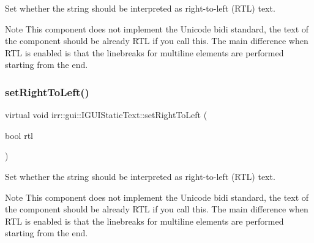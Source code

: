 Set whether the string should be interpreted as right-\/to-\/left (R\+TL) text. 

\begin{DoxyNote}{Note}
This component does not implement the Unicode bidi standard, the text of the component should be already R\+TL if you call this. The main difference when R\+TL is enabled is that the linebreaks for multiline elements are performed starting from the end. 
\end{DoxyNote}
\mbox{\label{classirr_1_1gui_1_1IGUIStaticText_a43cee247cf34faa30851f4e8c10b2367}} 
\subsubsection{\texorpdfstring{set\+Right\+To\+Left()}{setRightToLeft()}\hspace{0.1cm}{\footnotesize\ttfamily [2/2]}}
{\footnotesize\ttfamily virtual void irr\+::gui\+::\+I\+G\+U\+I\+Static\+Text\+::set\+Right\+To\+Left (\begin{DoxyParamCaption}\item[{bool}]{rtl }\end{DoxyParamCaption})\hspace{0.3cm}{\ttfamily [pure virtual]}}



Set whether the string should be interpreted as right-\/to-\/left (R\+TL) text. 

\begin{DoxyNote}{Note}
This component does not implement the Unicode bidi standard, the text of the component should be already R\+TL if you call this. The main difference when R\+TL is enabled is that the linebreaks for multiline elements are performed starting from the end. 
\end{DoxyNote}
\mbox{\label{classirr_1_1gui_1_1IGUIStaticText_ad8635f1247971277543cfff6e1fa9277}} 

